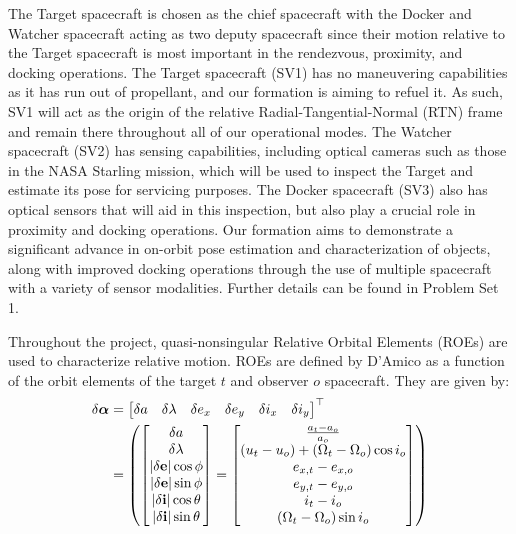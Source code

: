 The Target spacecraft is chosen as the chief spacecraft with the Docker and Watcher spacecraft acting as two deputy spacecraft since their motion relative to the Target spacecraft is most important in the rendezvous, proximity, and docking operations. The Target spacecraft (SV1) has no maneuvering capabilities as it has run out of propellant, and our formation is aiming to refuel it. As such, SV1 will act as the origin of the relative Radial-Tangential-Normal (RTN) frame and remain there throughout all of our operational modes. The Watcher spacecraft (SV2) has sensing capabilities, including optical cameras such as those in the NASA Starling mission, which will be used to inspect the Target and estimate its pose for servicing purposes. The Docker spacecraft (SV3) also has optical sensors that will aid in this inspection, but also play a crucial role in proximity and docking operations. Our formation aims to demonstrate a significant advance in on-orbit pose estimation and characterization of objects, along with improved docking operations through the use of multiple spacecraft with a variety of sensor modalities. Further details can be found in Problem Set 1. 

Throughout the project, quasi-nonsingular Relative Orbital Elements (ROEs) are used to characterize relative motion. ROEs are defined by D'Amico as a function of the orbit elements of the target $t$ and observer $o$ spacecraft.\cite{damicothesis} They are given by:
\begin{align}
\delta \boldsymbol{\alpha} &= 
\begin{bmatrix} \label{eq:quasi_nonsign_roe}
\delta a & \delta \lambda & \delta e_x & \delta e_y & \delta i_x & \delta i_y
\end{bmatrix}^\top \notag \\
&= 
\left( 
\begin{bmatrix}
\delta a \\
\delta \lambda \\
|\delta\mathbf{e}| \cos \phi \\
|\delta\mathbf{e}| \sin \phi \\
|\delta\mathbf{i}| \cos \theta \\
|\delta\mathbf{i}| \sin \theta
\end{bmatrix}
= 
\begin{bmatrix}
\frac{a_t - a_o}{a_o} \\
(u_t - u_o) + (\Omega_t - \Omega_o) \cos i_o \\
e_{x,t} - e_{x,o} \\
e_{y,t} - e_{y,o} \\
i_t - i_o \\
(\Omega_t - \Omega_o) \sin i_o
\end{bmatrix}
\right)
\end{align}

